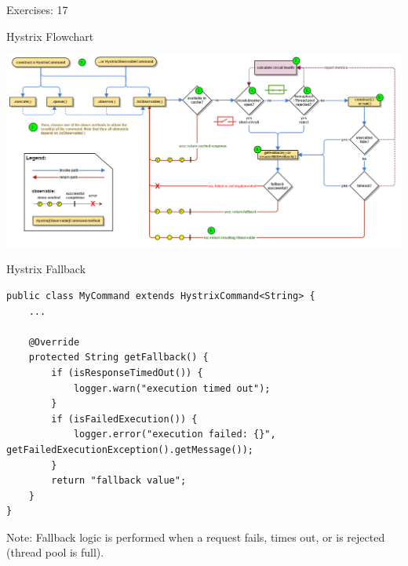 \begin{frame}{Exercises: 17}
	\begin{figure}
	\end{figure}
\end{frame}

\begin{frame}{Hystrix Flowchart}
\centerline{
	\includegraphics[width=\paperwidth]{../Service2ServiceCommunication/images/hystrix-flow-chart-original}
}
\end{frame}

\begin{frame}[fragile]{Hystrix Fallback}
\begin{lstlisting}
public class MyCommand extends HystrixCommand<String> {
	...
	
    @Override
    protected String getFallback() {
        if (isResponseTimedOut()) {
            logger.warn("execution timed out");
        }
        if (isFailedExecution()) {
            logger.error("execution failed: {}", getFailedExecutionException().getMessage());
        }
        return "fallback value";
    }
}
\end{lstlisting}
\footnotesize{Note: Fallback logic is performed when a request fails, times out, or is rejected (thread pool is full).}
\end{frame}

